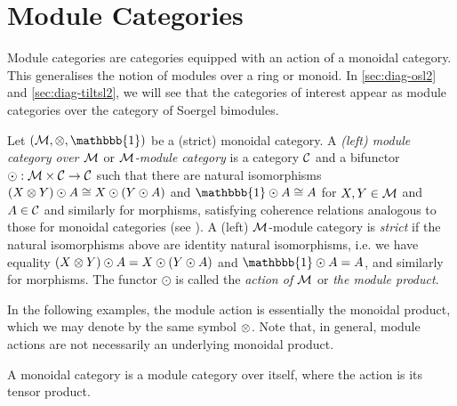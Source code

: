 \section{Module Categories}
\label{sec:module-cat}

Module categories are categories equipped with an action of a monoidal category. This generalises the notion of modules over a ring or monoid. In \autoref{sec:diag-osl2} and \autoref{sec:diag-tiltsl2}, we will see that the categories of interest appear as module categories over the category of Soergel bimodules.

\begin{definition}
    Let $(\mcal{M}, \tensor, \mathbbb{1})$ be a (strict) monoidal category. A \textit{(left) module category over $\mathcal{M}$} or \textit{$\mathcal{M}$-module category} is a category $\mathcal{C}$ and a bifunctor $\odot: \mathcal{M} \times \mathcal{C} \to \mathcal{C}$ such that there are natural isomorphisms $(X \otimes Y) \odot A \cong X \odot (Y \odot A)$ and $\mathbbb{1} \odot A \cong A$ for $X,Y \in \mathcal{M}$ and $A \in \mathcal{C}$ and similarly for morphisms, satisfying coherence relations analogous to those for monoidal categories (see \cite[Definition 7.1.2]{tensor-categories}). A (left) $\mathcal{M}$-module category is \textit{strict} if the natural isomorphisms above are identity natural isomorphisms, i.e. we have equality $(X \otimes Y) \odot A = X \odot (Y \odot A)$ and $\mathbbb{1} \odot A = A$, and similarly for morphisms. The functor $\odot$ is called the \textit{action of $\mathcal{M}$} or \textit{the module product}. 
\end{definition}

In the following examples, the module action is essentially the monoidal product, which we may denote by the same symbol $\otimes$. Note that, in general, module actions are not necessarily an underlying monoidal product.

\begin{example}
    A monoidal category is a module category over itself, where the action is its tensor product.
\end{example}

